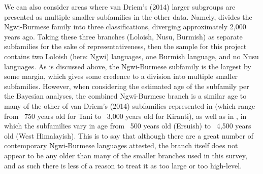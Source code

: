 We can also consider areas where van Driem's (2014) larger subgroups are presented as multiple smaller subfamilies in the other data. Namely,  divides the Ngwi-Burmese family into three classifications, diverging approximately 2,000 years ago. Taking these three branches (Loloish, Nusu, Burmish) as separate subfamilies for the sake of representativeness, then the sample for this project contains two Loloish (here: Ngwi) languages, one Burmish language, and no Nusu languages. As is discussed above, the Ngwi-Burmese subfamily is the largest by some margin, which gives some credence to a division into multiple smaller subfamilies. However, when considering the estimated age of the subfamily per the Bayesian analyses, the combined Ngwi-Burmese branch is a similar age to many of the other of van Driem's (2014) subfamilies represented in  (which range from ~750 years old for Tani to ~3,000 years old for Kiranti), as well as in , in which the subfamilies vary in age from ~500 years old (Ersuish) to ~4,500 years old (West Himalayish). This is to say that although there are a great number of contemporary Ngwi-Burmese languages attested, the branch itself does not appear to be any older than many of the smaller branches used in this survey, and as such there is less of a reason to treat it as too large or too high-level.




